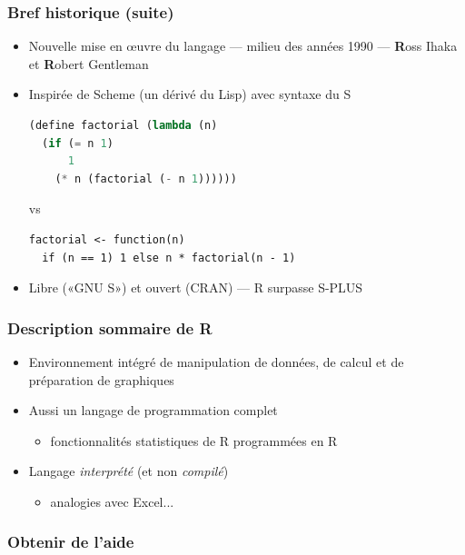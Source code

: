 \begin{frame}[fragile=singleslide]
  \frametitle{Bref historique (suite)}

  \begin{itemize}
  \item Nouvelle mise en {\oe}uvre du langage --- milieu des années
    1990 --- \textbf{R}oss Ihaka et \textbf{R}obert Gentleman
  \item Inspirée de Scheme (un dérivé du Lisp) avec syntaxe du S
\begin{Schunk}
\begin{lstlisting}[language=lisp]
(define factorial (lambda (n)
  (if (= n 1)
      1
    (* n (factorial (- n 1))))))
\end{lstlisting}
\end{Schunk}
vs
\begin{Schunk}
\begin{lstlisting}
factorial <- function(n)
  if (n == 1) 1 else n * factorial(n - 1)
\end{lstlisting}
\end{Schunk}
  \item Libre («GNU S») et ouvert (CRAN) --- R surpasse S-PLUS
  \end{itemize}
\end{frame}

\begin{frame}
  \frametitle{Description sommaire de R}

  \begin{itemize}
  \item Environnement intégré de manipulation de données, de calcul et
    de préparation de graphiques
  \item Aussi un langage de programmation complet
    \begin{itemize}
    \item fonctionnalités statistiques de R programmées en R
    \end{itemize}
  \item Langage \emph{interprété} (et non \emph{compilé})
    \begin{itemize}
    \item analogies avec Excel...
    \end{itemize}
  \end{itemize}

  \pause
\end{frame}

\begin{frame}
  \frametitle{Obtenir de l'aide}

\end{frame}

